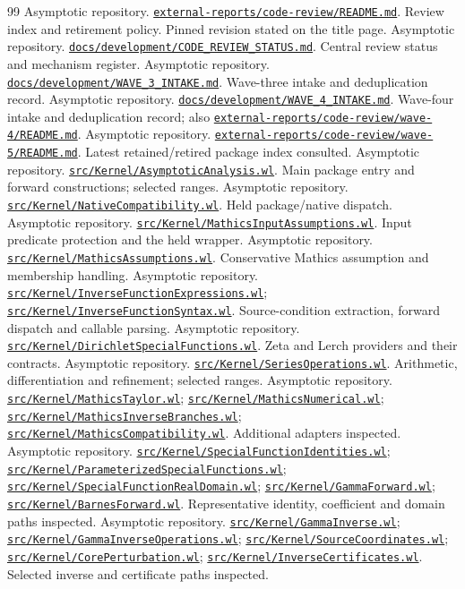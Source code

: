 \documentclass[11pt,a4paper]{article}
\newcommand{\repo}[1]{\href{https://github.com/VladimirReshetnikov/Asymptotic/blob/8cee870994f506b501bae3ea6bd4a3a7edb895c1/#1}{\nolinkurl{#1}}}
\newcommand{\kernel}[1]{\repo{src/Kernel/#1}}
\begin{document}
\begingroup\footnotesize\setlength{\parskip}{1.5pt}
\setlength{\itemsep}{1pt}
\begin{thebibliography}{99}
 Asymptotic repository. \repo{external-reports/code-review/README.md}. Review index and retirement policy. Pinned revision stated on the title page.
 Asymptotic repository. \repo{docs/development/CODE_REVIEW_STATUS.md}. Central review status and mechanism register.
 Asymptotic repository. \repo{docs/development/WAVE_3_INTAKE.md}. Wave-three intake and deduplication record.
 Asymptotic repository. \repo{docs/development/WAVE_4_INTAKE.md}. Wave-four intake and deduplication record; also \repo{external-reports/code-review/wave-4/README.md}.
 Asymptotic repository. \repo{external-reports/code-review/wave-5/README.md}. Latest retained/retired package index consulted.
 Asymptotic repository. \kernel{AsymptoticAnalysis.wl}. Main package entry and forward constructions; selected ranges.
 Asymptotic repository. \kernel{NativeCompatibility.wl}. Held package/native dispatch.
 Asymptotic repository. \kernel{MathicsInputAssumptions.wl}. Input predicate protection and the held wrapper.
 Asymptotic repository. \kernel{MathicsAssumptions.wl}. Conservative Mathics assumption and membership handling.
 Asymptotic repository. \kernel{InverseFunctionExpressions.wl}; \kernel{InverseFunctionSyntax.wl}. Source-condition extraction, forward dispatch and callable parsing.
 Asymptotic repository. \kernel{DirichletSpecialFunctions.wl}. Zeta and Lerch providers and their contracts.
 Asymptotic repository. \kernel{SeriesOperations.wl}. Arithmetic, differentiation and refinement; selected ranges.
 Asymptotic repository. \kernel{MathicsTaylor.wl}; \kernel{MathicsNumerical.wl}; \kernel{MathicsInverseBranches.wl}; \kernel{MathicsCompatibility.wl}. Additional adapters inspected.
 Asymptotic repository. \kernel{SpecialFunctionIdentities.wl}; \kernel{ParameterizedSpecialFunctions.wl}; \kernel{SpecialFunctionRealDomain.wl}; \kernel{GammaForward.wl}; \kernel{BarnesForward.wl}. Representative identity, coefficient and domain paths inspected.
 Asymptotic repository. \kernel{GammaInverse.wl}; \kernel{GammaInverseOperations.wl}; \kernel{SourceCoordinates.wl}; \kernel{CorePerturbation.wl}; \kernel{InverseCertificates.wl}. Selected inverse and certificate paths inspected.

\end{thebibliography}
\end{document}
